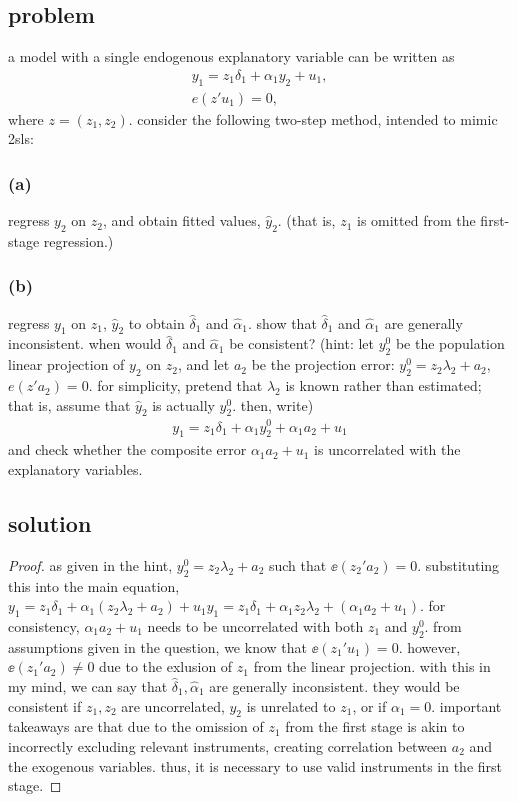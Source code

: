 \documentclass[10pt, a4paper]{article}
\begin{document}
    \subsection*{problem}
      a model with a single endogenous explanatory variable can be written as
      \begin{gather}
        y_1 = z_1 \delta_1 + \alpha_1 y_2 + u_1, \\
        e(z'u_1) = 0,
      \end{gather}
      where $z = (z_1, z_2)$. consider the following two-step method, intended to mimic 2sls:
    \subsubsection*{(a)}
      regress $y_2$ on $z_2$, and obtain fitted values, $\hat{y}_2$. (that is, $z_1$ is omitted from the first-stage regression.)
    \subsubsection*{(b)}
      regress $y_1$ on $z_1$, $\hat{y}_2$ to obtain $\hat{\delta}_1$ and $\hat{\alpha}_1$. show that $\hat{\delta}_1$ and $\hat{\alpha}_1$ are generally inconsistent. when would $\hat{\delta}_1$ and $\hat{\alpha}_1$ be consistent? (hint: let $y_2^0$ be the population linear projection of $y_2$ on $z_2$, and let $a_2$ be the projection error: $y_2^0 = z_2 \lambda_2 + a_2$, $e(z'a_2) = 0$. for simplicity, pretend that $\lambda_2$ is known rather than estimated; that is, assume that $\hat{y}_2$ is actually $y_2^0$. then, write)
      \begin{gather}
        y_1 = z_1 \delta_1 + \alpha_1 y_2^0 + \alpha_1 a_2 + u_1
      \end{gather}
      and check whether the composite error $\alpha_1 a_2 + u_1$ is uncorrelated with the explanatory variables.
    \subsection*{solution}
      \begin{proof}
        as given in the hint, $y_2^0 = z_2\lambda_2 + a_2$ such that $\ee(z_2'a_2)=0$. substituting this into the main equation, $y_1 = z_1\delta_1+\alpha_1(z_2\lambda_2+a_2)+u_1y_1 = z_1\delta_1 + \alpha_1z_2\lambda_2 + (\alpha_1a_2+u_1)$. for consistency, $\alpha_1a_2 + u_1$ needs to be uncorrelated with both $z_1$ and $y_2^0$. from assumptions given in the question, we know that $\ee(z_1'u_1)=0$. however, $\ee(z_1'a_2)\ne0$ due to the exlusion of $z_1$ from the linear projection. with this in my mind, we can say that $\hat{\delta}_1,\hat{\alpha}_1$ are generally inconsistent. they would be consistent if $z_1, z_2$ are uncorrelated, $y_2$ is unrelated to $z_1$, or if $\alpha_1=0$. important takeaways are that due to the omission of $z_1$ from the first stage is akin to incorrectly excluding relevant instruments, creating correlation between $a_2$ and the exogenous variables. thus, it is necessary to use valid instruments in the first stage. 
      \end{proof}
\end{document}
